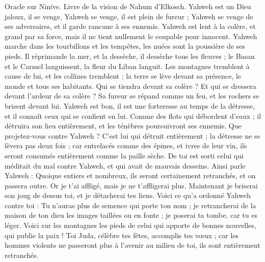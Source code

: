 \begin{multicols}{2}
\VerseOne{}Oracle sur Ninive. Livre de la vision de Nahum d’Elkosch.
Yahweh est un Dieu jaloux, il se venge, Yahweh se venge, il est plein de fureur ; Yahweh se venge de ses adversaires, et il garde rancune à ses ennemis.
Yahweh est lent à la colère, et grand par sa force, mais il ne tient nullement le coupable pour innocent. Yahweh marche dans les tourbillons et les tempêtes, les nuées sont la poussière de ses pieds.
Il réprimande la mer, et la dessèche, il dessèche tous les fleuves ; le Basan et le Carmel languissent, la fleur du Liban languit.
Les montagnes tremblent à cause de lui, et les collines tremblent ; la terre se lève devant sa présence, le monde et tous ses habitants.
Qui se tiendra devant sa colère ? Et qui se dressera devant l'ardeur de sa colère ? Sa fureur se répand comme un feu, et les rochers se brisent devant lui.
Yahweh est bon, il est une forteresse au temps de la détresse, et il connaît ceux qui se confient en lui.
Comme des flots qui débordent d'eaux ; il détruira son lieu entièrement, et les ténèbres poursuivront ses ennemis.
Que projetez-vous contre Yahweh ? C'est lui qui détruit entièrement ; la détresse ne se lèvera pas deux fois ;
car entrelacés comme des épines, et ivres de leur vin, ils seront consumés entièrement comme la paille sèche.
De toi est sorti celui qui méditait du mal contre Yahweh, et qui avait de mauvais desseins.
Ainsi parle Yahweh : Quoique entiers et nombreux, ils seront certainement retranchés, et on passera outre. Or je t'ai affligé, mais je ne t'affligerai plus.
Maintenant je briserai son joug de dessus toi, et je détacherai tes liens.
Voici ce qu’a ordonné Yahweh contre toi : Tu n’auras plus de semence qui porte ton nom ; je retrancherai de la maison de ton dieu les images taillées ou en fonte ; je poserai ta tombe, car tu es léger.
\VerseOne{}Voici sur les montagnes les pieds de celui qui apporte de bonnes nouvelles, qui publie la paix ! Toi Juda, célèbre tes fêtes, accomplis tes vœux ; car les hommes violents ne passeront plus à l'avenir au milieu de toi, ils sont entièrement retranchés.

\end{multicols}
